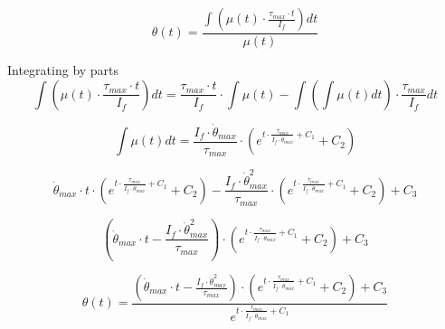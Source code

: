 \begin{enumerate}
    \begin{equation*}
        \theta(t) = \frac{\int(\mu(t) \cdot \frac{\tau_{max}\cdot t}{I_f})dt}{\mu(t)}
    \end{equation*}

    Integrating by parts
    \begin{equation*}
        \int(\mu(t) \cdot \frac{\tau_{max}\cdot t}{I_f})dt = \frac{\tau_{max}\cdot t}{I_f}\cdot\int\mu(t) - \int (\int \mu(t) dt) \cdot \frac{\tau_{max}}{I_f}dt
    \end{equation*}

    \begin{equation*}
        \int \mu(t) dt = \frac{I_f \cdot \dot{\theta}_{max}}{\tau_{max}} \cdot (e^{t\cdot \frac{\tau_{max}}{I_f \cdot \dot{\theta}_{max}}+C_1}+C_2)
    \end{equation*}

    \begin{equation*}
        \dot{\theta}_{max} \cdot t\cdot (e^{t\cdot \frac{\tau_{max}}{I_f \cdot \dot{\theta}_{max}}+C_1}+C_2) - \frac{I_f \cdot \dot{\theta}_{max}^2}{\tau_{max}} \cdot (e^{t\cdot \frac{\tau_{max}}{I_f \cdot \dot{\theta}_{max}}+C_1}+C_2) +C_3
    \end{equation*}


    \begin{equation*}
        (\dot{\theta}_{max} \cdot t- \frac{I_f \cdot \dot{\theta}_{max}^2}{\tau_{max}})\cdot (e^{t\cdot \frac{\tau_{max}}{I_f \cdot \dot{\theta}_{max}}+C_1}+C_2)+C_3 
    \end{equation*}

    \begin{equation*}
        \theta(t) = \frac{(\dot{\theta}_{max} \cdot t- \frac{I_f \cdot \dot{\theta}_{max}^2}{\tau_{max}})\cdot (e^{t\cdot \frac{\tau_{max}}{I_f \cdot \dot{\theta}_{max}}+C_1}+C_2)+C_3 }
        {e^{t\cdot \frac{\tau_{max}}{I_f \cdot \dot{\theta}_{max}}+C_1}}
    \end{equation*}



\end{enumerate}
